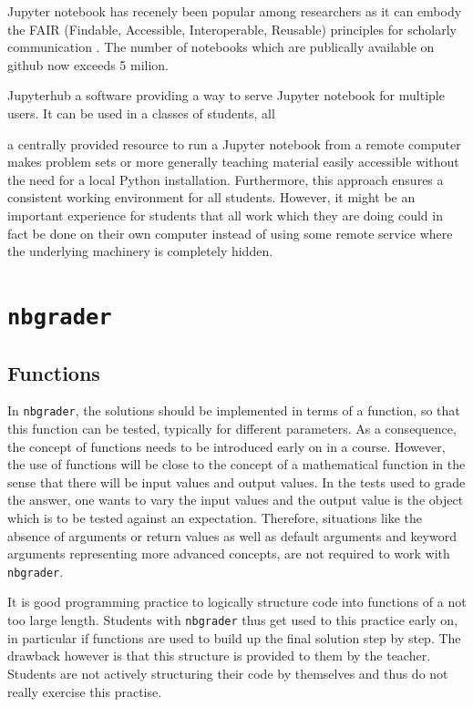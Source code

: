 \documentclass[twocolumn]{svjour3}          %
\begin{document}
Jupyter notebook has recenely been popular among researchers as it can
embody the FAIR (Findable, Accessible, Interoperable, Reusable)
principles for scholarly communication \cite{Randles2017}. The number
of notebooks which are publically available on github now exceeds 5
milion.


Jupyterhub a software providing a way to serve Jupyter notebook for
multiple users. It can be used in a classes of students, all

 a centrally provided resource to run a Jupyter notebook from a
remote computer makes problem sets or more generally teaching material easily
accessible without the need for a local Python installation. Furthermore, this
approach ensures a consistent working environment for all students. However,
it might be an important experience for students that all work which they
are doing could in fact be done on their own computer instead of using some
remote service where the underlying machinery is completely hidden.

\section{\texttt{nbgrader}}

\subsection{Functions}

In \texttt{nbgrader}, the solutions should be implemented in terms of a
function, so that this function can be tested, typically for different
parameters. As a consequence, the concept of functions needs to be introduced
early on in a course. However, the use of functions will be close to the
concept of a mathematical function in the sense that there will be input values
and output values. In the tests used to grade the answer, one wants to vary the
input values and the output value is the object which is to be tested against
an expectation. Therefore, situations like the absence of arguments or return
values as well as default arguments and keyword arguments representing more
advanced concepts, are not required to work with \texttt{nbgrader}.

It is good programming practice to logically structure code into functions of a
not too large length. Students with \texttt{nbgrader} thus get used to this
practice early on, in particular if functions are used to build up the final
solution step by step. The drawback however is that this structure is provided
to them by the teacher. Students are not actively structuring their code by
themselves and thus do not really exercise this practise.
\end{document}
